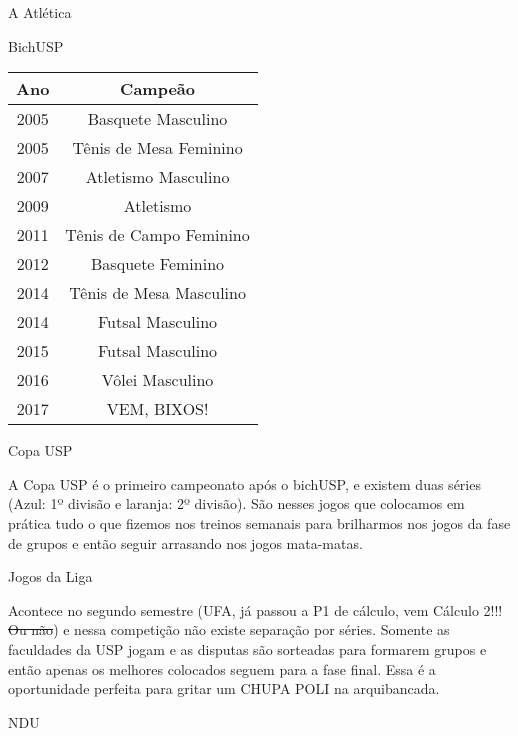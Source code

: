 \begin{secao}{A Atlética}
\begin{subsecao}{BichUSP}
\begin{center}
  \begin{tabular}{c|c}
   \hline
   Ano & Campeão\\
   \hline
   2005 & Basquete Masculino \\
   2005 & Tênis de Mesa Feminino \\
   2007 & Atletismo Masculino\\
   2009 & Atletismo\\
   2011 & Tênis de Campo Feminino\\
   2012 & Basquete Feminino\\
   2014 & Tênis de Mesa Masculino\\
   2014 & Futsal Masculino\\
   2015 & Futsal Masculino\\
    2016 & Vôlei Masculino\\
    2017 & VEM, BIXOS!\\
    \hline
  \end{tabular}
\end{center}

\end{subsecao}
\begin{subsecao}{Copa USP}

A Copa USP é o primeiro campeonato após o bichUSP, e existem duas séries (Azul:
1º divisão e laranja: 2º divisão). São nesses jogos que colocamos em prática
tudo o que fizemos nos treinos semanais para brilharmos nos jogos da fase de
grupos e então seguir arrasando nos jogos mata-matas.

\end{subsecao}
\begin{subsecao}{Jogos da Liga}

Acontece no segundo semestre (UFA, já passou a P1 de cálculo, vem Cálculo 2!!!
\sout{Ou não}) e nessa competição não existe separação por séries. Somente as
faculdades da USP jogam e as disputas são sorteadas para formarem grupos e
então apenas os melhores colocados seguem para a fase final. Essa é a
oportunidade perfeita para gritar um CHUPA POLI na arquibancada.

\end{subsecao}
\begin{subsecao}{NDU}


\end{subsecao}
\end{secao}
